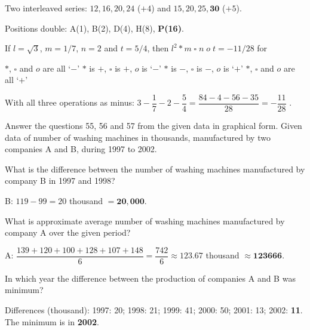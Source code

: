 Two interleaved series: $12, 16, 20, 24$ ($+4$) and $15, 20, 25, \mathbf{30}$ ($+5$).

Positions double: A(1), B(2), D(4), H(8), \textbf{P(16)}.

If $l=\sqrt3$, $m=1/7$, $n=2$ and $t=5/4$, then $l^2 * m \;\square\; n \;o\; t=-11/28$ for

$*$, $\square$ and $o$ are all `$-$'
$*$ is $+$, $\square$ is $+$, $o$ is `$-$'
$*$ is $-$, $\square$ is $-$, $o$ is `$+$'
$*$, $\square$ and $o$ are all `$+$'

With all three operations as minus: $3-\dfrac17-2-\dfrac54=\dfrac{84-4-56-35}{28}=-\dfrac{11}{28}$ \checkmark.

Answer the questions 55, 56 and 57 from the given data in graphical form. Given data of number of washing machines in thousands, manufactured by two companies A and B, during 1997 to 2002.
\begin{center}
\end{center}

What is the difference between the number of washing machines manufactured by company B in 1997 and 1998?

B: $119-99=20$ thousand $=\mathbf{20{,}000}$.

What is approximate average number of washing machines manufactured by company A over the given period?

A: $\dfrac{139+120+100+128+107+148}{6}=\dfrac{742}{6}\approx123.67$ thousand $\approx\mathbf{123666}$.

In which year the difference between the production of companies A and B was minimum?

Differences (thousand): 1997: 20; 1998: 21; 1999: 41; 2000: 50; 2001: 13; 2002: \textbf{11}. The minimum is in \textbf{2002}.

